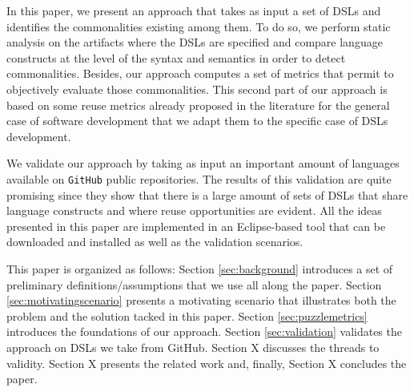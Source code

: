 
In this paper, we present an approach that takes as input a set of DSLs and identifies the commonalities existing among them. To do so, we perform static analysis on the artifacts where the DSLs are specified and compare language constructs at the level of the syntax and semantics in order to detect commonalities. Besides, our approach computes a set of metrics that permit to objectively evaluate those commonalities. This second part of our approach is based on some reuse metrics already proposed in the literature for the general case of software development \cite{Berger:2014,Berger:126283} that we adapt them to the specific case of DSLs development.

We validate our approach by taking as input an important amount of languages available on \texttt{GitHub} public repositories. The results of this validation are quite promising since they show that there is a large amount of sets of DSLs that share language constructs and where reuse opportunities are evident. All the ideas presented in this paper are implemented in an Eclipse-based tool that can be downloaded and installed as well as the validation scenarios. 


This paper is organized as follows: Section \ref{sec:background} introduces a set of preliminary definitions/assumptions that we use all along the paper. Section \ref{sec:motivatingscenario} presents a motivating scenario that illustrates both the problem and the solution tacked in this paper. Section \ref{sec:puzzlemetrics} introduces the foundations of our approach. Section \ref{sec:validation} validates the approach on DSLs we take from GitHub. Section X discusses the threads to validity. Section X presents the related work and, finally, Section X concludes the paper. 

